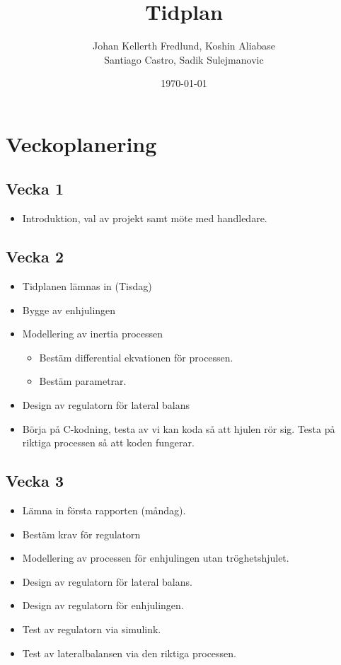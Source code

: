 \documentclass[a4paper]{article}
\title{Tidplan}
\author{Johan Kellerth Fredlund, Koshin Aliabase\\ Santiago Castro, Sadik Sulejmanovic}
\date{\today}
\begin{document}
\maketitle



\section{Veckoplanering}

	\subsection*{Vecka 1}
    
    \begin{itemize}
    \item Introduktion, val av projekt samt möte med handledare.
	\end{itemize}

	\subsection*{Vecka 2}

	\begin{itemize}
    \item Tidplanen lämnas in (Tisdag)
    \item Bygge av enhjulingen
    \item Modellering av inertia processen
    	\begin{itemize}
		\item Bestäm differential ekvationen för processen.
    	\item Bestäm parametrar.
		\end{itemize}
	\item Design av regulatorn för lateral balans
	\item Börja på C-kodning, testa av vi kan koda så att hjulen rör sig. Testa på riktiga processen så att koden fungerar.        
	\end{itemize}
    
    \subsection*{Vecka 3}
    \begin{itemize}
    \item Lämna in första rapporten (måndag).
	\item Bestäm krav för regulatorn
	\item Modellering av processen för enhjulingen utan tröghetshjulet.
    \item Design av regulatorn för lateral balans.
    \item Design av regulatorn för enhjulingen.
    \item Test av regulatorn via simulink.
    \item Test av lateralbalansen via den riktiga processen.
	\end{itemize}
    
\end{document}
